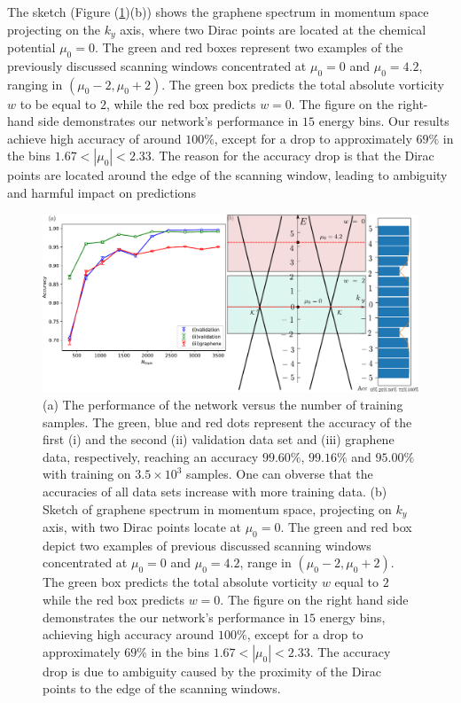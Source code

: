 \documentclass{article}
\begin{document}
The sketch (Figure (\ref{fig:Acc_density_spectrum})(b)) shows the graphene spectrum in momentum space projecting on the $ k_y $ axis, where two Dirac points are located at the chemical potential $ \mu_0 = 0 $. The green and red boxes represent two examples of the previously discussed scanning windows concentrated at $ \mu_0 = 0 $ and $ \mu_{0} = 4.2 $, ranging in $ \left(\mu_0 - 2, \mu_0 + 2\right) $. The green box predicts the total absolute vorticity $ w $ to be equal to $ 2 $, while the red box predicts $ w = 0 $. The figure on the right-hand side demonstrates our network's performance in $ 15 $ energy bins. Our results achieve high accuracy of around $ 100 \% $, except for a drop to approximately $ 69 \% $ in the bins $ 1.67 < |\mu_0| < 2.33 $. The reason for the accuracy drop is that the Dirac points are located around the edge of the scanning window, leading to ambiguity and harmful impact on predictions

\begin{figure}[H]
    \centering
    \includegraphics[width=1\textwidth]{Accuracy_density_spectrum.pdf}
    \caption{(a) The performance of the network versus the number of training samples. The green, blue and red dots represent the accuracy of the first (i) and the second (ii) validation data set and (iii) graphene data, respectively, reaching an accuracy $ 99.60 \% $, $ 99.16 \% $ and $ 95.00 \% $ with training on $ 3.5 \times 10^3 $ samples. One can obverse that the accuracies of all data sets increase with more training data. (b) Sketch of graphene spectrum in momentum space, projecting on $ k_y $ axis, with two Dirac points locate at $ \mu_0=0 $. The green and red box depict two examples of previous discussed scanning windows concentrated at $ \mu_0=0 $ and $ \mu_{0} = 4.2  $, range in $ \left(\mu_0 -2,\mu_0 +2\right) $. The green box predicts the total absolute vorticity $ w $ equal to $ 2 $ while the red box predicts $ w=0 $. The figure on the right hand side demonstrates the our network's performance in $ 15 $ energy bins, achieving high accuracy around $ 100 \% $, except for a drop to approximately $ 69 \% $ in the bins $ 1.67<|\mu_0|<2.33$. The accuracy drop is due to ambiguity caused by the proximity of the Dirac points to the edge of the scanning windows. }
    \label{fig:Acc_density_spectrum}
\end{figure}
\end{document}
